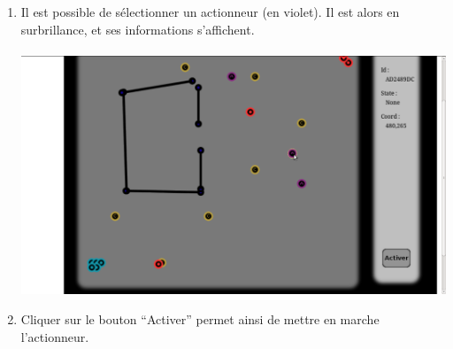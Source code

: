 \begin{enumerate}
 \item Il est possible de sélectionner un actionneur (en violet). Il est alors en surbrillance, et ses informations s'affichent.\\
 ~~\\
 \includegraphics[scale=0.22]{image/infosGame}
 \item Cliquer sur le bouton ``Activer'' permet ainsi de mettre en marche l'actionneur.\\
\end{enumerate}


